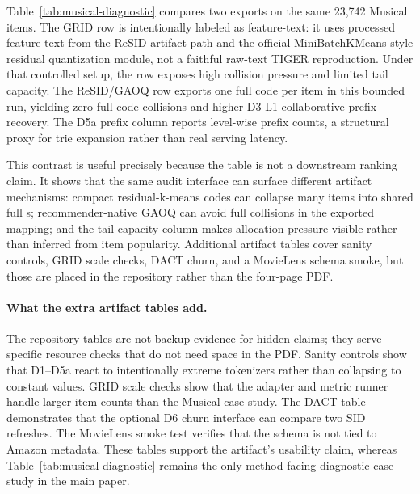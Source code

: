 Table~\ref{tab:musical-diagnostic} compares two exports on the same 23,742
Musical items. The GRID row is intentionally labeled as feature-text: it uses
processed feature text from the ReSID artifact path and the official
MiniBatchKMeans-style residual quantization module, not a faithful raw-text
TIGER reproduction. Under that controlled setup, the row exposes high collision
pressure and limited tail capacity. The ReSID/GAOQ row exports one full code
per item in this bounded run, yielding zero full-code collisions and higher
D3-L1 collaborative prefix recovery. The D5a prefix column reports level-wise
prefix counts, a structural proxy for trie expansion rather than real serving
latency.

This contrast is useful precisely because the table is not a downstream
ranking claim. It shows that the same audit interface can surface different
artifact mechanisms: compact residual-k-means codes can collapse many items
into shared full \sid{}s; recommender-native GAOQ can avoid full collisions in
the exported mapping; and the tail-capacity column makes allocation pressure
visible rather than inferred from item popularity. Additional artifact tables
cover sanity controls, GRID scale checks, DACT churn, and a MovieLens schema
smoke, but those are placed in the repository rather than the four-page PDF.

\paragraph{What the extra artifact tables add.}
The repository tables are not backup evidence for hidden claims; they serve
specific resource checks that do not need space in the PDF. Sanity controls
show that D1--D5a react to intentionally extreme tokenizers rather than
collapsing to constant values. GRID scale checks show that the adapter and
metric runner handle larger item counts than the Musical case study. The DACT
table demonstrates that the optional D6 churn interface can compare two SID
refreshes. The MovieLens smoke test verifies that the schema is not tied to
Amazon metadata. These tables support the artifact's usability claim, whereas
Table~\ref{tab:musical-diagnostic} remains the only method-facing diagnostic
case study in the main paper.
